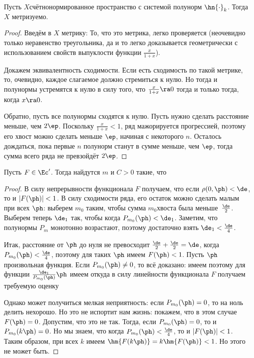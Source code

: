 \documentclass[a4paper]{article}
\begin{document}
\begin{stm}
Пусть $X$\т счётно\д нормированное пространство с системой полунорм $\hn{\cdot}_k$. Тогда $X$ метризуемо.
\end{stm}
\begin{proof}
Введём в $X$ метрику:
То, что это метрика, легко проверяется (неочевидно только неравенство треугольника,
да и то легко доказывается геометрически с использованием свойств выпуклости функции $\frac{x}{1+x}$).

Докажем эквивалентность сходимости. Если есть сходимость по такой метрике,
то, очевидно, каждое слагаемое должно стремиться к нулю. Но тогда и полунормы устремятся
к нулю в силу того, что $\frac{x}{1+x} \ra 0$ тогда и только тогда, когда $x \ra 0$.

Обратно, пусть все полунормы сходятся к нулю. Пусть нужно сделать
расстояние меньше, чем $2\ep$. Поскольку $\frac{x}{1+x} < 1$,
ряд мажорируется прогрессией, поэтому его хвост можно сделать меньше $\ep$, начиная с некоторого $n$.
Осталось дождаться, пока первые $n$ полунорм станут в сумме меньше, чем $\ep$, тогда сумма всего
ряда не превзойдёт $2\ep$.
\end{proof}

\begin{stm}
Пусть $F \in \Ec'$. Тогда найдутся $m$ и $C> 0$ такие, что
\end{stm}
\begin{proof}
В силу непрерывности функционала $F$ получаем, что если $\rho(0,\ph) < \de$, то и $|F(\ph)| < 1$.
В силу сходимости ряда, его остаток можно сделать малым при всех $\ph$: выберем $m_0$ таким,
чтобы сумма $m_0$\д хвоста была меньше~$\frac{\de}{2}$.
Выберем теперь $\de_1$ так, чтобы
когда $P_{m_0}(\ph) < \de_1$. Заметим, что полунормы $P_m$ монотонно возрастают,
поэтому достаточно взять $\de_1 < \frac{\de}{4}$.

Итак, расстояние от $\ph$ до нуля не превосходит $\frac{\de}{2} + \frac\de2 = \de$,
когда $P_{m_0}(\ph) < \frac{\de}{4}$, поэтому для таких $\ph$ имеем $F(\ph) < 1$.
Пусть $\ph$\т произвольная функция. Если $P_{m_0}(\ph) \neq 0$, то всё доказано:
имеем
поэтому для функции $\frac{\de_1}{P_{m_0}(\ph)}\ph$ имеем
откуда в силу линейности функционала $F$ получаем требуемую оценку

Однако может получиться мелкая неприятность: если $P_{m_0}(\ph) = 0$, то на ноль делить нехорошо.
Но это не испортит нам жизнь: покажем, что в этом случае $F(\ph) = 0$.
Допустим, что это не так. Тогда, если $P_{m_0}(\ph) = 0$, то и $P_{m_0}(k\ph) = 0$.
Но мы знаем, что когда $P_{m_0}(\ph) < \frac{\de}{4}$, то и $|F(\ph)| < 1$.
Таким образом, при всех $k$ имеем $\hm{F(k\ph)} = k\hm{F(\ph)} < 1$. Но этого не может быть.
\end{proof}
\end{document}
